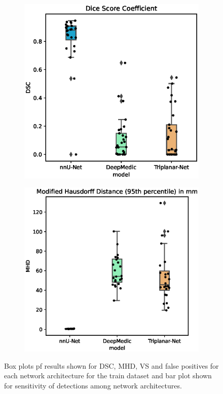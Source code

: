 \begin{figure}[htp]
	\centering
	\begin{subfigure}{.6\linewidth}
		\includegraphics[width=\linewidth]{figures/DSC.eps}
	\end{subfigure}
	\begin{subfigure}{.6\linewidth}
		\includegraphics[width=\linewidth]{figures/MHD.eps}
	\end{subfigure}
	\caption[Plots of results of train dataset.]{Box plots pf results shown for DSC, MHD, VS and false positives for each network architecture for the train dataset and bar plot shown for sensitivity of detections among network architectures.}
	\label{fig:results}
\end{figure}
